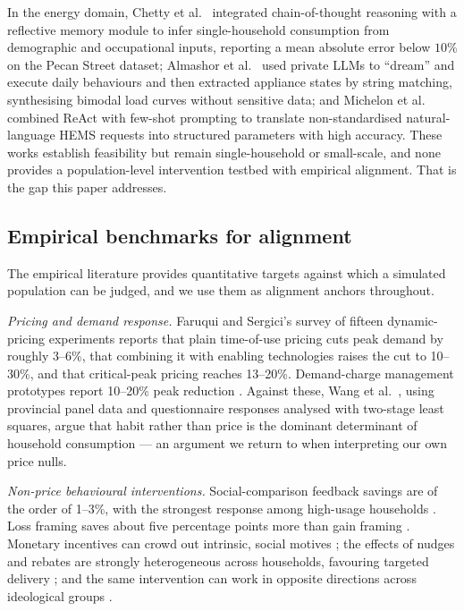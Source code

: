 \documentclass[11pt]{article}
\begin{document}
In the energy domain, Chetty et al.\ \cite{chetty2025} integrated chain-of-thought reasoning with a
reflective memory module to infer single-household consumption from demographic and occupational inputs,
reporting a mean absolute error below $10\%$ on the Pecan Street dataset; Almashor et al.\
\cite{almashor2024} used private LLMs to ``dream'' and execute daily behaviours and then extracted
appliance states by string matching, synthesising bimodal load curves without sensitive data; and
Michelon et al.\ \cite{michelon2025} combined ReAct with few-shot prompting to translate non-standardised
natural-language HEMS requests into structured parameters with high accuracy. These works establish
feasibility but remain single-household or small-scale, and none provides a population-level intervention
testbed with empirical alignment. That is the gap this paper addresses.

\subsection{Empirical benchmarks for alignment}
\label{sec:benchmarks}
The empirical literature provides quantitative targets against which a simulated population can be judged,
and we use them as alignment anchors throughout.

\noindent\emph{Pricing and demand response.} Faruqui and Sergici's survey of fifteen dynamic-pricing
experiments \cite{faruqui2010} reports that plain time-of-use pricing cuts peak demand by roughly 3--6\%,
that combining it with enabling technologies raises the cut to 10--30\%, and that critical-peak pricing
reaches 13--20\%. Demand-charge management prototypes report 10--20\% peak reduction \cite{escarrega2025}.
Against these, Wang et al.\ \cite{wang2021}, using provincial panel data and questionnaire responses
analysed with two-stage least squares, argue that habit rather than price is the dominant determinant of
household consumption --- an argument we return to when interpreting our own price nulls.

\noindent\emph{Non-price behavioural interventions.} Social-comparison feedback savings are of the order
of 1--3\%, with the strongest response among high-usage households \cite{allcott2011,ayres2013}. Loss
framing saves about five percentage points more than gain framing \cite{ghesla2019}. Monetary incentives
can crowd out intrinsic, social motives \cite{pellerano2017}; the effects of nudges and rebates are
strongly heterogeneous across households, favouring targeted delivery \cite{murakami2022}; and the same
intervention can work in opposite directions across ideological groups \cite{costa2010}.
\end{document}
